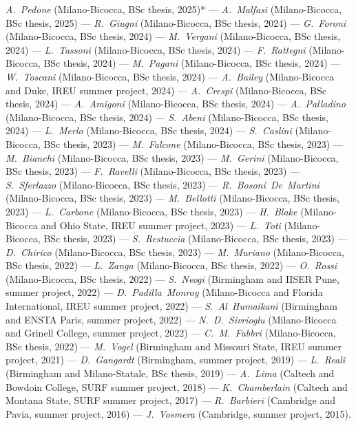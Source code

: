 \textit{\textit{A.~Pedone}} (Milano-Bicocca, BSc thesis, 2025)* --- 
\textit{\textit{A.~Malfasi}} (Milano-Bicocca, BSc thesis, 2025) --- 
\textit{\textit{R.~Giugni}} (Milano-Bicocca, BSc thesis, 2024) --- 
\textit{\textit{G.~Foroni}} (Milano-Bicocca, BSc thesis, 2024) --- 
\textit{\textit{M.~Vergani}} (Milano-Bicocca, BSc thesis, 2024) --- 
\textit{\textit{L.~Tassoni}} (Milano-Bicocca, BSc thesis, 2024) --- 
\textit{\textit{F.~Rattegni}} (Milano-Bicocca, BSc thesis, 2024) --- 
\textit{\textit{M.~Pagani}} (Milano-Bicocca, BSc thesis, 2024) --- 
\textit{\textit{W.~Toscani}} (Milano-Bicocca, BSc thesis, 2024) --- 
\textit{\textit{A.~Bailey}} (Milano-Bicocca and Duke, IREU summer project, 2024) --- 
\textit{\textit{A.~Crespi}} (Milano-Bicocca, BSc thesis, 2024) --- 
\textit{\textit{A.~Amigoni}} (Milano-Bicocca, BSc thesis, 2024) --- 
\textit{\textit{A.~Palladino}} (Milano-Bicocca, BSc thesis, 2024) --- 
\textit{\textit{S.~Abeni}} (Milano-Bicocca, BSc thesis, 2024) --- 
\textit{\textit{L.~Merlo}} (Milano-Bicocca, BSc thesis, 2024) --- 
\textit{\textit{S.~Caslini}} (Milano-Bicocca, BSc thesis, 2023) --- 
\textit{\textit{M.~Falcone}} (Milano-Bicocca, BSc thesis, 2023) --- 
\textit{\textit{M.~Bianchi}} (Milano-Bicocca, BSc thesis, 2023) --- 
\textit{\textit{M.~Gerini}} (Milano-Bicocca, BSc thesis, 2023) --- 
\textit{\textit{F.~Ravelli}} (Milano-Bicocca, BSc thesis, 2023) --- 
\textit{\textit{S.~Sferlazzo}} (Milano-Bicocca, BSc thesis, 2023) --- 
\textit{\textit{R.~Bosoni~De~Martini}} (Milano-Bicocca, BSc thesis, 2023) --- 
\textit{\textit{M.~Bellotti}} (Milano-Bicocca, BSc thesis, 2023) --- 
\textit{\textit{L.~Carbone}} (Milano-Bicocca, BSc thesis, 2023) --- 
\textit{\textit{H.~Blake}} (Milano-Bicocca and Ohio State, IREU summer project, 2023) --- 
\textit{\textit{L.~Toti}} (Milano-Bicocca, BSc thesis, 2023) --- 
\textit{\textit{S.~Restuccia}} (Milano-Bicocca, BSc thesis, 2023) --- 
\textit{\textit{D.~Chirico}} (Milano-Bicocca, BSc thesis, 2023) --- 
\textit{\textit{M.~Muriano}} (Milano-Bicocca, BSc thesis, 2022) --- 
\textit{\textit{L.~Zanga}} (Milano-Bicocca, BSc thesis, 2022) --- 
\textit{\textit{O.~Rossi}} (Milano-Bicocca, BSc thesis, 2022) --- 
\textit{\textit{S.~Neogi}} (Birmingham and IISER Pune, summer project, 2022) --- 
\textit{\textit{D.~Padilla~Monroy}} (Milano-Bicocca and Florida International, IREU summer project, 2022) --- 
\textit{\textit{S.~Al~Humaikani}} (Birmingham and ENSTA Paris, summer project, 2022) --- 
\textit{\textit{N.~D.~Sivrioglu}} (Milano-Bicocca and Grinell College, summer project, 2022) --- 
\textit{\textit{C.~M.~Fabbri}} (Milano-Bicocca, BSc thesis, 2022) --- 
\textit{\textit{M.~Vogel}} (Birmingham and Missouri State, IREU summer project, 2021) --- 
\textit{\textit{D.~Gangardt}} (Birmingham, summer project, 2019) --- 
\textit{\textit{L.~Reali}} (Birmingham and Milano-Statale, BSc thesis, 2019) --- 
\textit{\textit{A.~Lima}} (Caltech and Bowdoin College, SURF summer project, 2018) --- 
\textit{\textit{K.~Chamberlain}} (Caltech and Montana State, SURF summer project, 2017) --- 
\textit{\textit{R.~Barbieri}} (Cambridge and Pavia, summer project, 2016) --- 
\textit{\textit{J.~Vosmera}} (Cambridge, summer project, 2015).